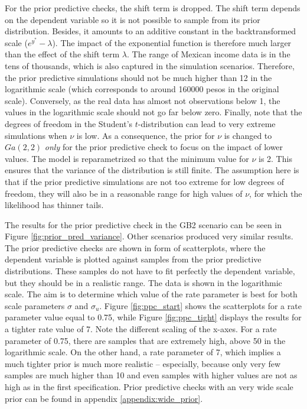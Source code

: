 For the prior predictive checks, the shift term is dropped.
The shift term depends on the dependent variable so it is not possible to sample from its prior distribution.
Besides, it amounts to an additive constant in the backtransformed scale ($e^{y^*} - \lambda$). The impact of the exponential function is therefore much larger than the effect of the shift term $\lambda$.
The range of Mexican income data is in the tens of thousands, which is also captured in the simulation scenarios.
Therefore, the prior predictive simulations should not be much higher than 12 in the logarithmic scale (which corresponds to around 160000 pesos in the original scale).
Conversely, as the real data has almost not observations below 1, the values in the logarithmic scale should not go far below zero.
Finally, note that the degrees of freedom in the Student's $t$-distribution can lead to very extreme simulations when $\nu$ is low.
As a consequence, the prior for $\nu$ is changed to $Ga(2, 2)$ \textit{only} for the prior predictive check to focus on the impact of lower values.
The model is reparametrized so that the minimum value for $\nu$ is 2. This ensures that the variance of the distribution is still finite.
The assumption here is that if the prior predictive simulations are not too extreme for low degrees of freedom, they will also be in a reasonable range for high values of $\nu$, for which the likelihood has thinner tails.


The results for the prior predictive check in the GB2 scenario can be seen in Figure \ref{fig:prior_pred_variance}.
Other scenarios produced very similar results.
The prior predictive checks are shown in form of scatterplots, where the dependent variable is plotted against samples from the prior predictive distributions.
These samples do not have to fit perfectly the dependent variable, but they should be in a realistic range.
The data is shown in the logarithmic scale.
The aim is to determine which value of the rate parameter is best for both scale parameters $\sigma$ and $\sigma_u$.
Figure \ref{fig:ppc_start} shows the scatterplots for a rate parameter value equal to 0.75, while Figure \ref{fig:ppc_tight} displays the results for a tighter rate value of 7.
Note the different scaling of the x-axes.
For a rate parameter of 0.75, there are samples that are extremely high, above 50 in the logarithmic scale.
On the other hand, a rate parameter of 7, which implies a much tighter prior is much more realistic – especially, because only very few samples are much higher than 10 and even samples with higher values are not as high as in the first specification.
Prior predictive checks with an very wide scale prior can be found in appendix \ref{appendix:wide_prior}.

